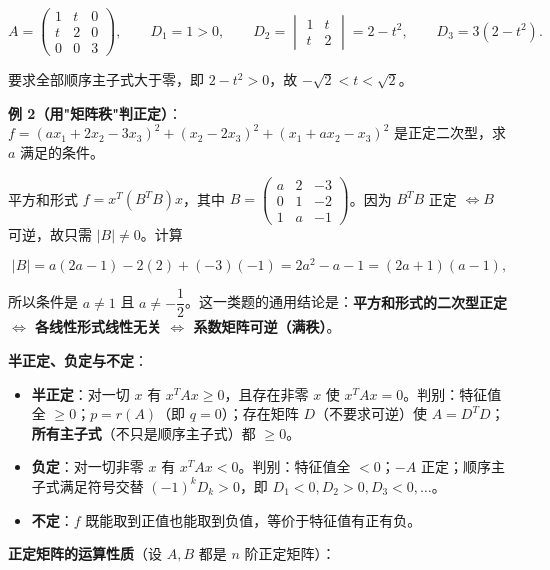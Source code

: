 \documentclass[11pt,openany,UTF8]{ctexbook}
\begin{document}
\[A=\begin{pmatrix}1&t&0\\t&2&0\\0&0&3\end{pmatrix},\qquad D_1=1>0,\qquad D_2=\begin{vmatrix}1&t\\t&2\end{vmatrix}=2-t^2,\qquad D_3=3(2-t^2) .\]

要求全部顺序主子式大于零，即 $2-t^2>0$，故 $-\sqrt2<t<\sqrt2$。

\textbf{例 2（用"矩阵秩"判正定）}：$f=(ax_1+2x_2-3x_3)^2+(x_2-2x_3)^2+(x_1+ax_2-x_3)^2$ 是正定二次型，求 $a$ 满足的条件。

平方和形式 $f=x^T(B^TB)x$，其中 $B=\begin{pmatrix}a&2&-3\\0&1&-2\\1&a&-1\end{pmatrix}$。因为 $B^TB$ 正定 $\iff B$ 可逆，故只需 $\vert B\vert\neq0$。计算

\[\vert B\vert=a(2a-1)-2(2)+(-3)(-1)=2a^2-a-1=(2a+1)(a-1),\]

所以条件是 $a\neq1$ 且 $a\neq-\dfrac12$。这一类题的通用结论是：\textbf{平方和形式的二次型正定 $\iff$ 各线性形式线性无关 $\iff$ 系数矩阵可逆（满秩）}。

\textbf{半正定、负定与不定}：

\begin{itemize}
\item \textbf{半正定}：对一切 $x$ 有 $x^TAx\geq0$，且存在非零 $x$ 使 $x^TAx=0$。判别：特征值全 $\geq0$；$p=r(A)$（即 $q=0$）；存在矩阵 $D$（不要求可逆）使 $A=D^TD$；\textbf{所有主子式}（不只是顺序主子式）都 $\geq0$。
\item \textbf{负定}：对一切非零 $x$ 有 $x^TAx<0$。判别：特征值全 $<0$；$-A$ 正定；顺序主子式满足符号交替 $(-1)^kD_k>0$，即 $D_1<0,D_2>0,D_3<0,\dots$。
\item \textbf{不定}：$f$ 既能取到正值也能取到负值，等价于特征值有正有负。
\end{itemize}
\textbf{正定矩阵的运算性质}（设 $A,B$ 都是 $n$ 阶正定矩阵）：
\end{document}
